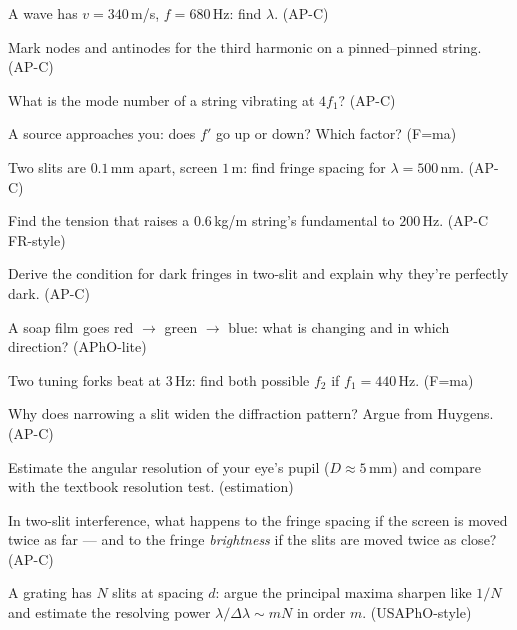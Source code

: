 \begin{exercise}[easy]
A wave has $v=340$\,m/s, $f=680$\,Hz: find $\lambda$. (AP-C)
\end{exercise}
\begin{exercise}[easy]
Mark nodes and antinodes for the third harmonic on a pinned--pinned
string. (AP-C)
\end{exercise}
\begin{exercise}[easy]
What is the mode number of a string vibrating at $4f_1$? (AP-C)
\end{exercise}
\begin{exercise}[easy]
A source approaches you: does $f'$ go up or down? Which factor?
(F=ma)
\end{exercise}
\begin{exercise}[easy]
Two slits are $0.1$\,mm apart, screen $1$\,m: find fringe spacing for
$\lambda=500$\,nm. (AP-C)
\end{exercise}
\begin{exercise}[medium]
Find the tension that raises a $0.6$\,kg/m string's fundamental to
$200$\,Hz. (AP-C FR-style)
\end{exercise}
\begin{exercise}[medium]
Derive the condition for dark fringes in two-slit and explain why
they're perfectly dark. (AP-C)
\end{exercise}
\begin{exercise}[medium]
A soap film goes red $\to$ green $\to$ blue: what is changing and in
which direction? (APhO-lite)
\end{exercise}
\begin{exercise}[medium]
Two tuning forks beat at $3$\,Hz: find both possible $f_2$ if
$f_1=440$\,Hz. (F=ma)
\end{exercise}
\begin{exercise}[medium]
Why does narrowing a slit widen the diffraction pattern? Argue from
Huygens. (AP-C)
\end{exercise}
\begin{exercise}[hard]
Estimate the angular resolution of your eye's pupil ($D\approx5$\,mm)
and compare with the textbook resolution test. (estimation)
\end{exercise}
\begin{exercise}[easy]
In two-slit interference, what happens to the fringe spacing if the
screen is moved twice as far --- and to the fringe \emph{brightness}
if the slits are moved twice as close? (AP-C)
\end{exercise}
\begin{exercise}[medium]
A grating has $N$ slits at spacing $d$: argue the principal maxima
sharpen like $1/N$ and estimate the resolving power
$\lambda/\Delta\lambda\sim mN$ in order $m$. (USAPhO-style)
\end{exercise}
